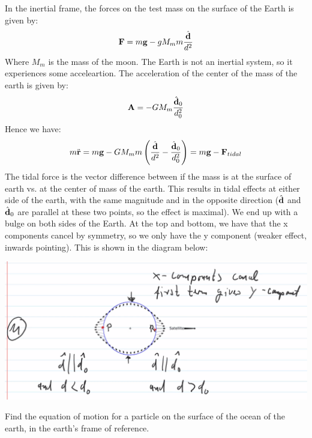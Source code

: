 \begin{s}
In the inertial frame, the forces on the test mass on the surface of the Earth is given by:
\[\mathbf{F} = m\mathbf{g} - gM_{m}m\frac{\hat{\mathbf{d}}}{d^2}\]
Where $M_m$ is the mass of the moon. The Earth is not an inertial system, so it experiences some acceleartion. The acceleration of the center of the mass of the earth is given by:
\[\mathbf{A} = -GM_{m}\frac{\hat{\mathbf{d}}_0}{d^2_0}\]
Hence we have:
\[m\ddot{\mathbf{r}} = m\mathbf{g} - GM_mm\left(\frac{\hat{\mathbf{d}}}{d^2} - \frac{\hat{\mathbf{d}}_0}{d^2_0}\right) = m\mathbf{g} - \mathbf{F}_{tidal}\]
The tidal force is the vector difference between if the mass is at the surface of earth vs. at the center of mass of the earth. This results in tidal effects at either side of the earth, with the same magnitude and in the opposite direction ($\hat{\mathbf{d}}$ and $\hat{\mathbf{d}}_0$ are parallel at these two points, so the effect is maximal). We end up with a bulge on both sides of the Earth. At the top and bottom, we have that the x components cancel by symmetry, so we only have the y component (weaker effect, inwards pointing). This is shown in the diagram below:
\begin{center}
    \includegraphics[scale=0.5]{Lecture-14/w14-img5.png}
\end{center}
\end{s}

\begin{p}
Find the equation of motion for a particle on the surface of the ocean of the earth, in the earth’s frame of reference. 
\end{p}
\begin{s}

\end{s}